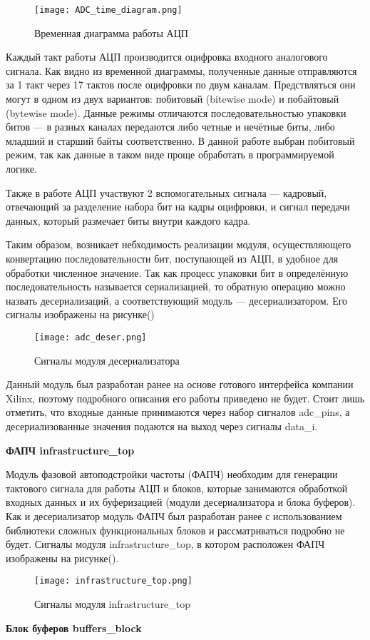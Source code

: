 \begin{figure}[ht]
    \centering
    \texttt{[image: ADC\_time\_diagram.png]}
    \caption{Временная диаграмма работы АЦП}
    \label{fig:mpr}
\end{figure}
Каждый такт работы АЦП производится оцифровка входного аналогового сигнала. Как видно из временной диаграммы, полученные данные отправляются за 1 такт через 17 тактов после оцифровки по двум каналам. Предствляться они могут в одном из двух вариантов: побитовый (bitewise mode) и побайтовый (bytewise mode). Данные режимы отличаются последовательностью упаковки битов --- в разных каналах передаются либо четные и нечётные биты, либо младший и старший байты соответственно. В данной работе выбран побитовый режим, так как данные в таком виде проще обработать в программируемой логике.\par
Также в работе АЦП участвуют 2 вспомогательных сигнала --- кадровый, отвечающий за разделение набора бит на кадры оцифровки, и сигнал передачи данных, который размечает биты внутри каждого кадра.\par
Таким образом, возникает небходимость реализации модуля, осуществляющего конвертацию последовательности бит, поступающей из АЦП, в удобное для обработки численное значение. Так как процесс упаковки бит в определённую последовательность называется сериализацией, то обратную операцию можно назвать десериализаций, а соответствующий модуль --- десериализатором. Его сигналы изображены на рисунке()\par
\begin{figure}[ht]
    \centering
    \texttt{[image: adc\_deser.png]}
    \caption{Сигналы модуля десериализатора}
    \label{fig:mpr}
\end{figure}
Данный модуль был разработан ранее на основе готового интерфейса компании Xilinx, поэтому подробного описания его работы приведено не будет. Стоит лишь отметить, что входные данные принимаются через набор сигналов adc\_pins, а десериализованные значения подаются на выход через сигналы data\_i.\par
\textbf{ФАПЧ infrastructure\_top}\par
Модуль фазовой автоподстройки частоты (ФАПЧ) необходим для генерации тактового сигнала для работы АЦП и блоков, которые занимаются обработкой входных данных и их буферизацией (модули десериализатора и блока буферов). Как и десериализатор модуль ФАПЧ был разработан ранее с использованием библиотеки сложных функциональных блоков и рассматриваться подробно не будет. Сигналы модуля infrastructure\_top, в котором расположен ФАПЧ изображены на рисунке().\par
\begin{figure}[ht]
    \centering
    \texttt{[image: infrastructure\_top.png]}
    \caption{Сигналы модуля infrastructure\_top}
    \label{fig:mpr}
\end{figure}
\textbf{Блок буферов buffers\_block}\par


